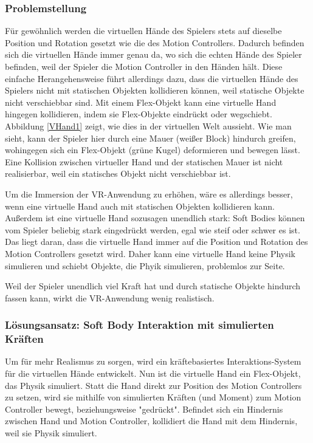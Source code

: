 \subsubsection{Problemstellung}
Für gewöhnlich werden die virtuellen Hände des Spielers stets auf dieselbe Position und Rotation gesetzt wie die des Motion Controllers. Dadurch befinden sich die virtuellen Hände immer genau da, wo sich die echten Hände des Spieler befinden, weil der Spieler die Motion Controller in den Händen hält.
Diese einfache Herangehensweise führt allerdings dazu, dass die virtuellen Hände des Spielers nicht mit statischen Objekten kollidieren können, weil statische Objekte nicht verschiebbar sind. Mit einem Flex-Objekt kann eine virtuelle Hand hingegen kollidieren, indem sie Flex-Objekte eindrückt oder wegschiebt. Abbildung \ref{VHand1} zeigt, wie dies in der virtuellen Welt aussieht. Wie man sieht, kann der Spieler hier durch eine Mauer (weißer Block) hindurch greifen, wohingegen sich ein Flex-Objekt (grüne Kugel) deformieren und bewegen lässt. Eine Kollision zwischen virtueller Hand und der statischen Mauer ist nicht realisierbar, weil ein statisches Objekt nicht verschiebbar ist.


Um die Immersion der VR-Anwendung zu erhöhen, wäre es allerdings besser, wenn eine virtuelle Hand auch mit statischen Objekten kollidieren kann. Außerdem ist eine virtuelle Hand sozusagen unendlich stark: Soft Bodies können vom Spieler beliebig stark eingedrückt werden, egal wie steif oder schwer es ist. Das liegt daran, dass die virtuelle Hand immer auf die Position und Rotation des Motion Controllers gesetzt wird. Daher kann eine virtuelle Hand keine Physik simulieren und schiebt Objekte, die Phyik simulieren, problemlos zur Seite.

Weil der Spieler unendlich viel Kraft hat und durch statische Objekte hindurch fassen kann, wirkt die VR-Anwendung wenig realistisch.

\subsubsection{Lösungsansatz: Soft Body Interaktion mit simulierten Kräften}
Um für mehr Realismus zu sorgen, wird ein kräftebasiertes Interaktions-System für die virtuellen Hände entwickelt. Nun ist die virtuelle Hand ein Flex-Objekt, das Physik simuliert. Statt die Hand direkt zur Position des Motion Controllers zu setzen, wird sie mithilfe von simulierten Kräften (und Moment) zum Motion Controller bewegt, beziehungsweise "gedrückt". Befindet sich ein Hindernis zwischen Hand und Motion Controller, kollidiert die Hand mit dem Hindernis, weil sie Physik simuliert. 

